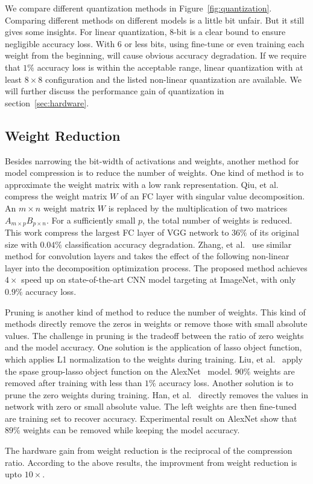 We compare different quantization methods in Figure~\ref{fig:quantization}.  Comparing different methods on different models is a little bit unfair. But it still gives some insights. For linear quantization, 8-bit is a clear bound to ensure negligible accuracy loss. With 6 or less bits, using fine-tune or even training each weight from the beginning, will cause obvious accuracy degradation. If we require that $1\%$ accuracy loss is within the acceptable range, linear quantization with at least $8\times 8$ configuration and the listed non-linear quantization are available. We will further discuss the performance gain of quantization in section~\ref{sec:hardware}. 


\subsection{Weight Reduction}\label{sec:software:wr}
Besides narrowing the bit-width of activations and weights, another method for model compression is to reduce the number of weights. One kind of method is to approximate the weight matrix with a low rank representation. Qiu, et al.~\cite{qiu2016going} compress the weight matrix $W$ of an FC layer with singular value decomposition. An $m\times n$ weight matrix $W$ is replaced by the multiplication of two matrices $A_{m\times p}B_{p\times n}$. For a sufficiently small $p$, the total number of weights is reduced. This work compress the largest FC layer of VGG network to $36\%$ of its original size with $0.04\%$ classification accuracy degradation. Zhang, et al.~\cite{zhang2015efficient} use similar method for convolution layers and takes the effect of the following non-linear layer into the decomposition optimization process. The proposed method achieves $4\times$ speed up on state-of-the-art CNN model targeting at ImageNet, with only $0.9\%$ accuracy loss.

Pruning is another kind of method to reduce the number of weights. This kind of methods directly remove the zeros in weights or remove those with small absolute values. The challenge in pruning is the tradeoff between the ratio of zero weights and the model accuracy. One solution is the application of lasso object function, which applies L1 normalization to the weights during training. Liu, et al.~\cite{liu2015sparse} apply the spase group-lasso object function on the AlexNet~\cite{krizhevsky2012imagenet} model. $90\%$ weights are removed after training with less than $1\%$ accuracy loss. Another solution is to prune the zero weights during training. Han, et al.~\cite{han2015deep} directly removes the values in network with zero or small absolute value. The left weights are then fine-tuned are training set to recover accuracy. Experimental result on AlexNet show that $89\%$ weights can be removed while keeping the model accuracy.

The hardware gain from weight reduction is the reciprocal of the compression ratio. According to the above results, the improvment from weight reduction is upto $10\times$.